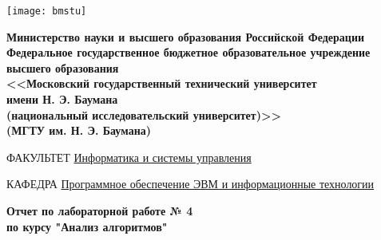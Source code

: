 \begin{titlepage}
    \thispagestyle{empty}

    \noindent\begin{minipage}{0.05\textwidth}
        \texttt{[image: bmstu]}
    \end{minipage}
    \hfill
    \begin{minipage}{0.85\textwidth}\raggedleft
        \begin{center}
            \fontsize{10pt}{0.3\baselineskip}\selectfont \textbf{Министерство науки и высшего образования Российской Федерации \\ Федеральное государственное бюджетное образовательное учреждение \\ высшего образования \\ <<Московский государственный технический университет \\ имени Н. Э. Баумана \\ (национальный исследовательский университет)>> \\ (МГТУ им. Н. Э. Баумана)}
        \end{center}
    \end{minipage}

    \begin{center}
        \fontsize{12pt}{0.1\baselineskip}\selectfont
        \noindent\makebox[\linewidth]{\rule{\textwidth}{4pt}} \makebox[\linewidth]{\rule{\textwidth}{1pt}}
    \end{center}

    \begin{flushleft}
        \fontsize{12pt}{0.8\baselineskip}\selectfont

        ФАКУЛЬТЕТ \uline{
            \hfill
            Информатика и системы управления
            \hfill}

        КАФЕДРА \uline{\mbox{\hspace{4mm}}
            \hfill
            Программное обеспечение ЭВМ и информационные технологии
            \hfill}
    \end{flushleft}

    \vfill
    
    \begin{center}
        \fontsize{19pt}{\baselineskip}\selectfont
        \textbf{Отчет по лабораторной работе № 4} \\
        \textbf{по курсу "Анализ алгоритмов"}
    \end{center}

    \vfill
    

\end{titlepage}
